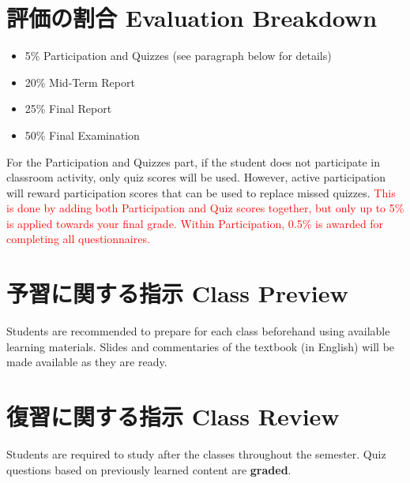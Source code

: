 \documentclass{article}
\begin{document}
\section{評価の割合 Evaluation Breakdown}
\begin{itemize}
	\item 5\% Participation and Quizzes (see paragraph below for details)
	\item 20\% Mid-Term Report
	\item 25\% Final Report
	\item 50\% Final Examination
\end{itemize}

For the Participation and Quizzes part, if the student does not participate in classroom activity, only quiz scores will be used. However, active participation will reward participation scores that can be used to replace missed quizzes. \textcolor{red}{This is done by adding both Participation and Quiz scores together, but only up to 5\% is applied towards your final grade. Within Participation, 0.5\% is awarded for completing all questionnaires.}

\section{予習に関する指示 Class Preview}
Students are recommended to prepare for each class beforehand using available learning materials. Slides and commentaries of the textbook (in English) will be made available as they are ready.

\section{復習に関する指示 Class Review}
Students are required to study after the classes throughout the semester. Quiz questions based on previously learned content are \textbf{graded}.
\end{document}

